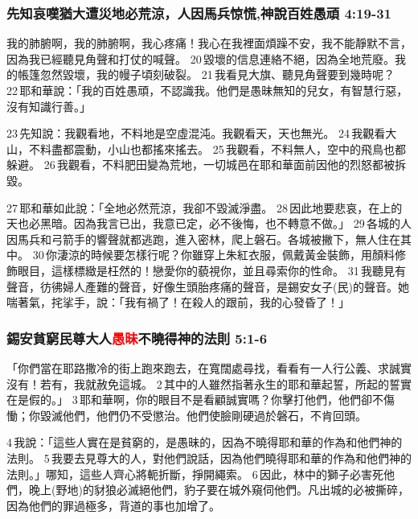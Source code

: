 \subsubsection{先知哀嘆猶大遭災地必荒涼，人因馬兵惊慌,神說百姓愚頑 4:19-31}
我的肺腑啊，我的肺腑啊，我心疼痛！我心在我裡面煩躁不安，我不能靜默不言，因為我已經聽見角聲和打仗的喊聲。 20 毀壞的信息連絡不絕，因為全地荒廢。我的帳篷忽然毀壞，我的幔子頃刻破裂。 21 我看見大旗、聽見角聲要到幾時呢？ 22 耶和華說：「我的百姓愚頑，不認識我。他們是愚昧無知的兒女，有智慧行惡，沒有知識行善。」

23 先知說：我觀看地，不料地是空虛混沌。我觀看天，天也無光。 24 我觀看大山，不料盡都震動，小山也都搖來搖去。 25 我觀看，不料無人，空中的飛鳥也都躲避。 26 我觀看，不料肥田變為荒地，一切城邑在耶和華面前因他的烈怒都被拆毀。

27 耶和華如此說：「全地必然荒涼，我卻不毀滅淨盡。 28 因此地要悲哀，在上的天也必黑暗。因為我言已出，我意已定，必不後悔，也不轉意不做。」 29 各城的人因馬兵和弓箭手的響聲就都逃跑，進入密林，爬上磐石。各城被撇下，無人住在其中。 30 你淒涼的時候要怎樣行呢？你雖穿上朱紅衣服，佩戴黃金裝飾，用顏料修飾眼目，這樣標緻是枉然的！戀愛你的藐視你，並且尋索你的性命。 31 我聽見有聲音，彷彿婦人產難的聲音，好像生頭胎疼痛的聲音，是錫安女子(民)的聲音。她喘著氣，挓挲手，說：「我有禍了！在殺人的跟前，我的心發昏了！」

\subsubsection{錫安貧窮民尊大人\textcolor{red}{愚昧}不曉得神的法則 5:1-6}
「你們當在耶路撒冷的街上跑來跑去，在寬闊處尋找，看看有一人行公義、求誠實沒有！若有，我就赦免這城。 2 其中的人雖然指著永生的耶和華起誓，所起的誓實在是假的。」 3 耶和華啊，你的眼目不是看顧誠實嗎？你擊打他們，他們卻不傷慟；你毀滅他們，他們仍不受懲治。他們使臉剛硬過於磐石，不肯回頭。

4 我說：「這些人實在是貧窮的，是愚昧的，因為不曉得耶和華的作為和他們神的法則。 5 我要去見尊大的人，對他們說話，因為他們曉得耶和華的作為和他們神的法則。」哪知，這些人齊心將軛折斷，掙開繩索。 6 因此，林中的獅子必害死他們，晚上(野地)的豺狼必滅絕他們，豹子要在城外窺伺他們。凡出城的必被撕碎，因為他們的罪過極多，背道的事也加增了。

